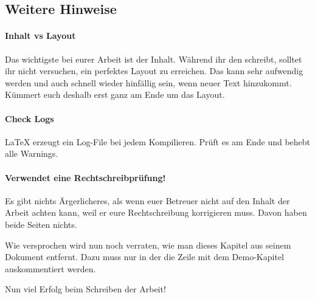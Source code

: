 \subsection{Weitere Hinweise}
%
%
\paragraph{Inhalt vs Layout}
%
Das wichtigste bei eurer Arbeit ist der Inhalt.
Während ihr den schreibt, solltet ihr nicht versuchen, ein perfektes
Layout zu erreichen.
Das kann sehr aufwendig werden und auch schnell wieder hinfällig sein, 
wenn neuer Text hinzukommt.
Kümmert euch deshalb erst ganz am Ende um das Layout.
%
\paragraph{Check Logs}
%
{\LaTeX} erzeugt ein Log-File bei jedem Kompilieren.
Prüft es am Ende und behebt alle Warnings.
%
\paragraph{Verwendet eine Rechtschreibprüfung!}
Es gibt nichts Ärgerlicheres, als wenn euer Betreuer nicht auf den Inhalt 
der Arbeit achten kann, weil er eure Rechtschreibung korrigieren muss.
Davon haben beide Seiten nichts.
%
\par
%
Wie versprochen wird nun noch verraten, wie man dieses Kapitel aus seinem Dokument
entfernt.
Dazu muss nur in der  die Zeile mit dem Demo-Kapitel auskommentiert
werden.
%
\par{Nun viel Erfolg beim Schreiben der Arbeit!}

